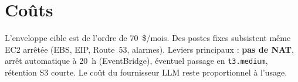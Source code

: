 \section{Coûts}

L'enveloppe cible est de l'ordre de 70~\$/mois. Des postes fixes subsistent même EC2 arrêtée
(EBS, EIP, Route~53, alarmes). Leviers principaux : \textbf{pas de NAT}, arrêt automatique à 20~h
(EventBridge), éventuel passage en \texttt{t3.medium}, rétention S3 courte. Le coût du fournisseur
LLM reste proportionnel à l'usage.
